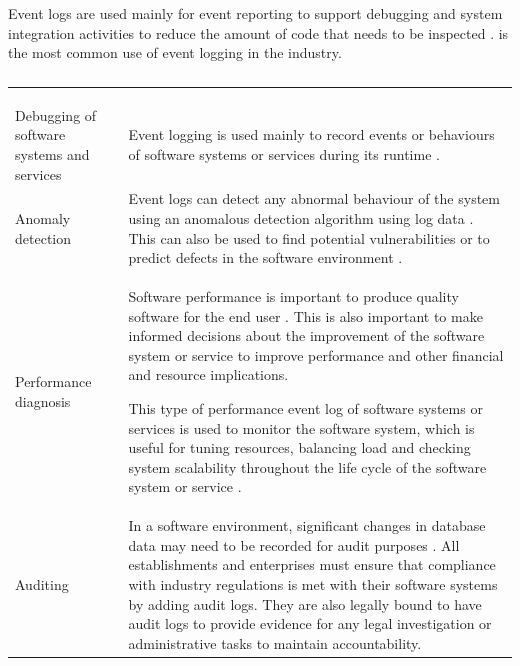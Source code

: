 Event logs are used mainly for event reporting to support debugging and system integration activities to reduce the amount of code that needs to be inspected \cite{Baccanico2014}.  is the most common use of event logging in the industry.

\begin{xltabular}{\textwidth}{p{3cm}X}
	\caption[Event logs usage]
	{\textit{Event logs usage}}
	\label{tbl:ch1_eventLogsUsage} \\
	\toprule
	 &  \\
	\midrule
	\endfirsthead

	\caption[]{\continueCaption} \\
	\toprule
	 &  \\
	\midrule
	\endhead

	\midrule
	 \\ 
	\endfoot
	\endlastfoot

	\RaggedRight Debugging of software systems and services & \RaggedRight Event logging is used mainly to record events or behaviours of software systems or services during its runtime \cite{Rong2018a}. \\

	\RaggedRight Anomaly detection & \RaggedRight Event logs can detect any abnormal behaviour of the system using an anomalous detection algorithm using log data \cite{Gurumdimma2016}. This can also be used to find potential vulnerabilities or to predict defects in the software environment \cite{Dwyer2013}. \\

	Performance diagnosis & \RaggedRight Software performance is important to produce quality software for the end user \cite{EvangelinGeetha2007, Baccanico2014}. This is also important to make informed decisions about the improvement of the software system or service to improve performance and other financial and resource implications. \par This type of performance event log of software systems or services is used to monitor the software system, which is useful for tuning resources, balancing load and checking system scalability throughout the life cycle of the software system or service \cite{Song2017}. \\
	
	Auditing & \RaggedRight In a software environment, significant changes in database data may need to be recorded for audit purposes \cite{Rong2018a}. All establishments and enterprises must ensure that compliance with industry regulations is met with their software systems by adding audit logs. They are also legally bound to have audit logs to provide evidence for any legal investigation or administrative tasks to maintain accountability. \\


\end{xltabular}
